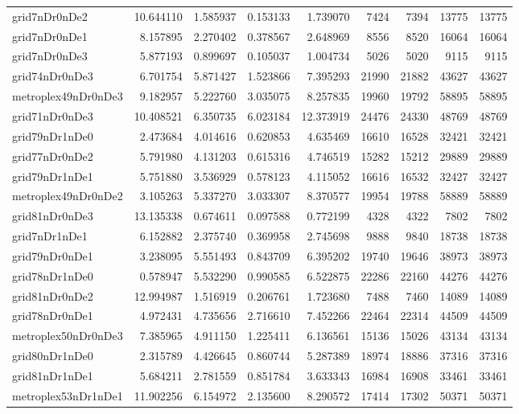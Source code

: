 \begin{longtable}{|l|r|r|r|r|r|r|r|r|}
grid7nDr0nDe2 & 10.644110 & 1.585937 & 0.153133 & 1.739070 & 7424 & 7394 & 13775 & 13775 \\
grid7nDr0nDe1 & 8.157895 & 2.270402 & 0.378567 & 2.648969 & 8556 & 8520 & 16064 & 16064 \\
grid7nDr0nDe3 & 5.877193 & 0.899697 & 0.105037 & 1.004734 & 5026 & 5020 & 9115 & 9115 \\
grid74nDr0nDe3 & 6.701754 & 5.871427 & 1.523866 & 7.395293 & 21990 & 21882 & 43627 & 43627 \\
metroplex49nDr0nDe3 & 9.182957 & 5.222760 & 3.035075 & 8.257835 & 19960 & 19792 & 58895 & 58895 \\
grid71nDr0nDe3 & 10.408521 & 6.350735 & 6.023184 & 12.373919 & 24476 & 24330 & 48769 & 48769 \\
grid79nDr1nDe0 & 2.473684 & 4.014616 & 0.620853 & 4.635469 & 16610 & 16528 & 32421 & 32421 \\
grid77nDr0nDe2 & 5.791980 & 4.131203 & 0.615316 & 4.746519 & 15282 & 15212 & 29889 & 29889 \\
grid79nDr1nDe1 & 5.751880 & 3.536929 & 0.578123 & 4.115052 & 16616 & 16532 & 32427 & 32427 \\
metroplex49nDr0nDe2 & 3.105263 & 5.337270 & 3.033307 & 8.370577 & 19954 & 19788 & 58889 & 58889 \\
grid81nDr0nDe3 & 13.135338 & 0.674611 & 0.097588 & 0.772199 & 4328 & 4322 & 7802 & 7802 \\
grid7nDr1nDe1 & 6.152882 & 2.375740 & 0.369958 & 2.745698 & 9888 & 9840 & 18738 & 18738 \\
grid79nDr0nDe1 & 3.238095 & 5.551493 & 0.843709 & 6.395202 & 19740 & 19646 & 38973 & 38973 \\
grid78nDr1nDe0 & 0.578947 & 5.532290 & 0.990585 & 6.522875 & 22286 & 22160 & 44276 & 44276 \\
grid81nDr0nDe2 & 12.994987 & 1.516919 & 0.206761 & 1.723680 & 7488 & 7460 & 14089 & 14089 \\
grid78nDr0nDe1 & 4.972431 & 4.735656 & 2.716610 & 7.452266 & 22464 & 22314 & 44509 & 44509 \\
metroplex50nDr0nDe3 & 7.385965 & 4.911150 & 1.225411 & 6.136561 & 15136 & 15026 & 43134 & 43134 \\
grid80nDr1nDe0 & 2.315789 & 4.426645 & 0.860744 & 5.287389 & 18974 & 18886 & 37316 & 37316 \\
grid81nDr1nDe1 & 5.684211 & 2.781559 & 0.851784 & 3.633343 & 16984 & 16908 & 33461 & 33461 \\
metroplex53nDr1nDe1 & 11.902256 & 6.154972 & 2.135600 & 8.290572 & 17414 & 17302 & 50371 & 50371 \\

\end{longtable}
